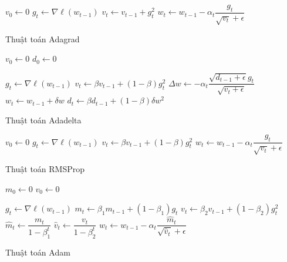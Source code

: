 \documentclass[14pt, a4paper]{article}
\theoremstyle{sltheorem}
\theoremstyle{soltheorem}
\begin{document}
\begin{algorithm}[h!]

    $v_0 \gets 0$\;
     {
        $g_t \gets \nabla \ell(w_{t-1})$\;
        $v_t \gets v_{t-1} + g_t^2$\;
        $w_t \gets w_{t-1} - \alpha_t \dfrac{g_t}{\sqrt{v_t} + \epsilon}$\;
    }

    \;
    \caption{Thuật toán Adagrad}
\end{algorithm}

\begin{algorithm}[h!]
    \DontPrintSemicolon

    $v_0 \gets 0$\;
    $d_0 \gets 0$\;

     {
        $g_t \gets \nabla \ell (w_{t-1})$\;
        $v_t \gets \beta v_{t-1} + (1-\beta) g_t^2$\;
        $\Delta w \gets -\alpha_t \dfrac{\sqrt{d_{t-1} + \epsilon}g_t}{\sqrt{v_t + \epsilon}}$\;
        $w_t \gets w_{t-1} + \delta w$\;
        $d_t \gets \beta d_{t-1} + (1-\beta) \delta w^2$\;
    }

    \;
    \caption{Thuật toán Adadelta}
\end{algorithm}


\begin{algorithm}[h!]
    \DontPrintSemicolon

    $v_0 \gets 0$\;
     {
        $g_t \gets \nabla \ell (w_{t-1})$\;
        $v_t \gets \beta v_{t-1} + (1-\beta) g_t^2$\;
        $w_t \gets w_{t-1} - \alpha_t \dfrac{g_t}{\sqrt{v_t} + \epsilon}$\;
    }

    \;
    \caption{Thuật toán RMSProp}
\end{algorithm}


\begin{algorithm}[h!]
    \DontPrintSemicolon

    $m_0 \gets 0$\;
    $v_0 \gets 0$\;

     {
        $g_t \gets \nabla \ell(w_{t-1})$\;
        $m_t \gets \beta_1 m_{t-1} + (1 - \beta_1)g_t$\;
        $v_t \gets \beta_2 v_{t-1} + (1 - \beta_2)g_t^2$\;
        $\hat{m}_t \gets \dfrac{m_t}{1 - \beta_1^t}$\;
        $\hat{v}_t \gets \dfrac{v_t}{1 - \beta_2^t}$\;
        $w_t \gets w_{t-1} - \alpha_t \dfrac{\hat{m}_t}{\sqrt{\hat{v}_t} + \epsilon}$\;
    }

    \;
    \caption{Thuật toán Adam}
\end{algorithm}
\end{document}
